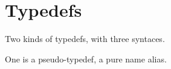 
\chapter{Typedefs}
\label{sec:typedefs}

Two kinds of typedefs, with three syntaces.  


One is a pseudo-typedef, a pure name alias.  


